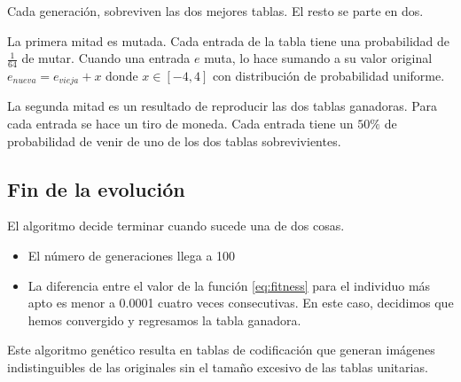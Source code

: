 Cada generación, sobreviven las dos mejores tablas. El resto se parte en dos.

La primera mitad es mutada. Cada entrada de la tabla tiene una probabilidad de $\frac{1}{64}$ de mutar. Cuando una entrada $e$ muta, lo hace sumando a su valor original
$e_{nueva} = e_{vieja} + x $ donde $x \in [-4, 4]$ con distribución de
probabilidad uniforme.

La segunda mitad es un resultado de reproducir las dos tablas ganadoras. Para
cada entrada se hace un tiro de moneda. Cada entrada tiene un $50\%$ de
probabilidad de venir de uno de los dos tablas sobrevivientes.

\subsection {Fin de la evolución}

El algoritmo decide terminar cuando sucede una de dos cosas.

\begin{itemize}
\item El número de generaciones llega a 100
\item La diferencia entre el valor de la función \ref{eq:fitness} para el
individuo más apto es menor a 0.0001 cuatro veces consecutivas. En este caso,
decidimos que hemos convergido y regresamos la tabla ganadora.
\end{itemize}

Este algoritmo genético resulta en tablas de codificación que generan imágenes
indistinguibles de las originales sin el tamaño excesivo de las tablas
unitarias.
